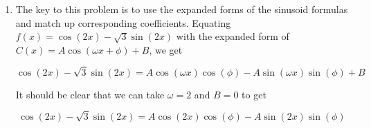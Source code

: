 {\begin{enumerate}

\item The key to this problem is to use the expanded forms of the sinusoid formulas and match up corresponding coefficients.  Equating   $f(x) = \cos(2x) - \sqrt{3} \sin(2x)$ with the expanded form of $C(x) = A \cos(\omega x + \phi) + B$, we get

\vspace{-.05in}

\[ \cos(2x) - \sqrt{3} \sin(2x) = A\cos(\omega x) \cos(\phi) - A \sin(\omega x)\sin(\phi) + B\]

It should be clear that we can take $\omega = 2$ and $B = 0$ to get

\[ \cos(2x) - \sqrt{3} \sin(2x) = A\cos(2x) \cos(\phi) - A \sin(2x)\sin(\phi) \]


\end{enumerate}}

